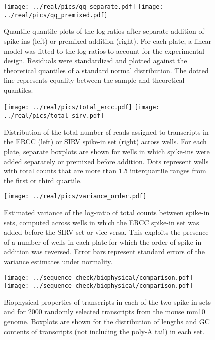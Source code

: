 \documentclass{article}
\begin{document}
\begin{figure}[btp]
    \begin{center}
        \texttt{[image: ../real/pics/qq\_separate.pdf]}
        \texttt{[image: ../real/pics/qq\_premixed.pdf]}
    \end{center}
    \caption{Quantile-quantile plots of the log-ratios after separate addition of spike-ins (left) or premixed addition (right).
        For each plate, a linear model was fitted to the log-ratios to account for the experimental design.
        Residuals were standardized and plotted against the theoretical quantiles of a standard normal distribution.
        The dotted line represents equality between the sample and theoretical quantiles.
    }
\end{figure}

\begin{figure}[btp]
    \begin{center}
        \texttt{[image: ../real/pics/total\_ercc.pdf]}
        \texttt{[image: ../real/pics/total\_sirv.pdf]}
    \end{center}
    \caption{Distribution of the total number of reads assigned to transcripts in the ERCC (left) or SIRV spike-in set (right) across wells.
        For each plate, separate boxplots are shown for wells in which spike-ins were added separately or premixed before addition.
        Dots represent wells with total counts that are more than 1.5 interquartile ranges from the first or third quartile.
    }
    \label{fig:totals}
\end{figure}

\begin{figure}[btp]
    \begin{center}
        \texttt{[image: ../real/pics/variance\_order.pdf]}
    \end{center}
    \caption{Estimated variance of the log-ratio of total counts between spike-in sets, computed across wells in which the ERCC spike-in set was added before the SIRV set or vice versa.
        This exploits the presence of a number of wells in each plate for which the order of spike-in addition was reversed.
        Error bars represent standard errors of the variance estimates under normality.
    }
\end{figure}

\begin{figure}[btp]
    \begin{center}
        \texttt{[image: ../sequence\_check/biophysical/comparison.pdf]}
        \texttt{[image: ../sequence\_check/biophysical/comparison.pdf]}
    \end{center}
    \caption{Biophysical properties of transcripts in each of the two spike-in sets and for 2000 randomly selected transcripts from the mouse mm10 genome.
    Boxplots are shown for the distribution of lengths and GC contents of transcripts (not including the poly-A tail) in each set.
}
\end{figure}
\end{document}
